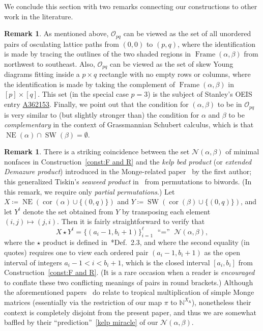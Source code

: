 \documentclass[noamsfonts,10pt]{amsart}
\newcommand{\N}{\mathbb{N}}
\newcommand{\NN}{\mathcal{N}}
\newcommand{\al}{\alpha}
\newcommand{\be}{\beta}
\DeclareMathOperator{\Fr}{Frame}
\renewcommand{\O}{\mathcal{O}}
\newcommand{\NE}[1]{\operatorname{NE}(#1)}
\newcommand{\SW}[1]{\operatorname{SW}(#1)}
\DeclareMathOperator{\cor}{cor}
\newcommand{\sA}{\mathsf{A}}
\newcommand{\1}{\mathbf{1}}
\theoremstyle{plain}
\theoremstyle{definition}
\newtheorem{remark}[theorem]{Remark}
\numberwithin{equation}{section}
\begin{document}
    We conclude this section with two remarks connecting our constructions to other work in the literature.

\begin{remark}
    \label{rem:osculating}
     As mentioned above, $\O_{pq}$ can be viewed as the set of all unordered pairs of osculating lattice paths from $(0,0)$ to $(p,q)$, where the identification is made by tracing the outlines of the two shaded regions in $\Fr(\al,\be)$ from northwest to southeast.
    Also, $\O_{pq}$ can be viewed as the set of  skew Young diagrams fitting inside a $p \times q$ rectangle with no empty rows or columns, where the identification is made by taking the complement of $\Fr(\al,\be)$ in $[p] \times [q]$.
    This set (in the special case $p=3$) is the subject of Stanley's OEIS entry \href{https://oeis.org/A362153}{A362153}.
    Finally, we point out that the condition for $(\al,\be)$ to be in $\O_{pq}$ is very similar to (but slightly stronger than) the condition for $\al$ and $\be$ to be \emph{complementary} in the context of Grassmannian Schubert calculus, which is that $\NE{\al} \cap \SW{\be} = \emptyset$.    
\end{remark}

\begin{remark}
    There is a striking coincidence between the set $\NN(\al, \be)$ of minimal nonfaces in Construction~\ref{const:F and R} and the \emph{kelp bed product} (or \emph{extended Demazure product}) introduced in the Monge-related paper~\cite{Erickson25} by the first author;
    this generalized Tiskin's \emph{seaweed product} in~\cite{Tiskin15} from permutations to biwords.
    (In this remark, we require only \emph{partial permutations}.)
    Let $X \coloneqq \NE{\cor(\al) \cup \{(0,q)\}}$ and $Y \coloneqq \SW{\cor(\be) \cup \{(0,q)\}}$, and let $Y^t$ denote the set obtained from $Y$ by transposing each element $(i,j) \mapsto (j,i)$.
    Then it is fairly straightforward to verify that
    \begin{equation}
        \label{kelp miracle}
        X \star Y^t = \{ (a_i-1, b_i+1) \}_{i=1}^\ell \text{ ``$=$'' } \NN(\al, \be),
    \end{equation}
    where the $\star$ product is defined in~\cite{Erickson25}*{Def.~2.3}, and where the second equality (in quotes) requires one to view each ordered pair $(a_i - 1, b_i + 1)$ as the open interval of integers $a_i - 1 < i < b_i + 1$, which is the closed interval $[a_i, b_i]$ from Construction~\ref{const:F and R}.
    (It is a rare occasion when a reader is \emph{encouraged} to conflate these two conflicting meanings of pairs in round brackets.)
    Although the aforementioned papers~\cites{Erickson25,Tiskin15} do relate to tropical multiplication of simple Monge matrices (essentially via the restriction of our map $\pi$ to $\N^{X_{\sA}}$), nonetheless their context is completely disjoint from the present paper, and thus we are somewhat baffled by their ``prediction''~\eqref{kelp miracle} of our $\NN(\al, \be)$.
\end{remark}
\end{document}
